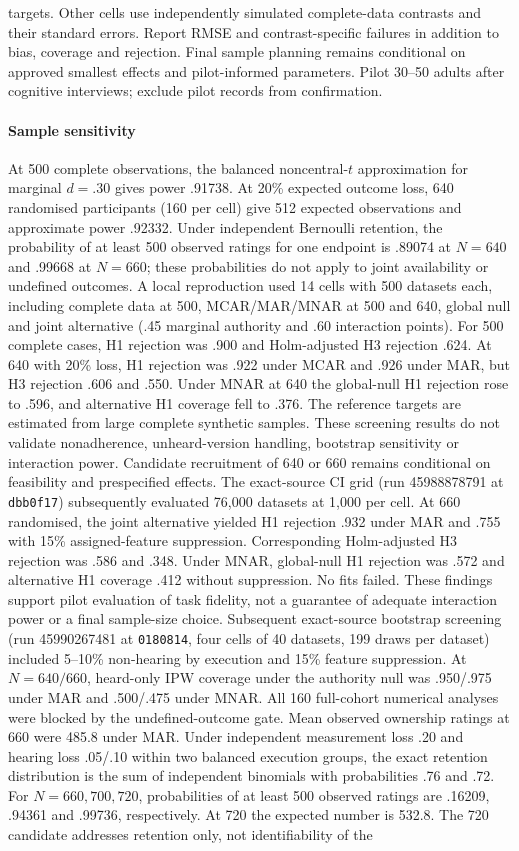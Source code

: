 \documentclass[11pt]{article}
\begin{document}
targets. Other cells use independently simulated complete-data contrasts and their standard errors. Report RMSE and contrast-specific failures in addition to bias, coverage and rejection. Final sample planning remains conditional on approved smallest effects and pilot-informed parameters. Pilot 30--50 adults after cognitive interviews; exclude pilot records from confirmation.


\paragraph{Sample sensitivity}
At 500 complete observations, the balanced noncentral-$t$ approximation for marginal $d=.30$ gives power .91738. At 20\% expected outcome loss, 640 randomised participants (160 per cell) give 512 expected observations and approximate power .92332. Under independent Bernoulli retention, the probability of at least 500 observed ratings for one endpoint is .89074 at $N=640$ and .99668 at $N=660$; these probabilities do not apply to joint availability or undefined outcomes. A local reproduction used 14 cells with 500 datasets each, including complete data at 500, MCAR/MAR/MNAR at 500 and 640, global null and joint alternative (.45 marginal authority and .60 interaction points). For 500 complete cases, H1 rejection was .900 and Holm-adjusted H3 rejection .624. At 640 with 20\% loss, H1 rejection was .922 under MCAR and .926 under MAR, but H3 rejection .606 and .550. Under MNAR at 640 the global-null H1 rejection rose to .596, and alternative H1 coverage fell to .376. The reference targets are estimated from large complete synthetic samples. These screening results do not validate nonadherence, unheard-version handling, bootstrap sensitivity or interaction power. Candidate recruitment of 640 or 660 remains conditional on feasibility and prespecified effects. The exact-source CI grid (run 45988878791 at \texttt{dbb0f17}) subsequently evaluated 76,000 datasets at 1,000 per cell. At 660 randomised, the joint alternative yielded H1 rejection .932 under MAR and .755 with 15\% assigned-feature suppression. Corresponding Holm-adjusted H3 rejection was .586 and .348. Under MNAR, global-null H1 rejection was .572 and alternative H1 coverage .412 without suppression. No fits failed. These findings support pilot evaluation of task fidelity, not a guarantee of adequate interaction power or a final sample-size choice. Subsequent exact-source bootstrap screening (run 45990267481 at \texttt{0180814}, four cells of 40 datasets, 199 draws per dataset) included 5--10\% non-hearing by execution and 15\% feature suppression. At $N=640/660$, heard-only IPW coverage under the authority null was .950/.975 under MAR and .500/.475 under MNAR. All 160 full-cohort numerical analyses were blocked by the undefined-outcome gate. Mean observed ownership ratings at 660 were 485.8 under MAR. Under independent measurement loss .20 and hearing loss .05/.10 within two balanced execution groups, the exact retention distribution is the sum of independent binomials with probabilities .76 and .72. For $N=660,700,720$, probabilities of at least 500 observed ratings are .16209, .94361 and .99736, respectively. At 720 the expected number is 532.8. The 720 candidate addresses retention only, not identifiability of the 
\end{document}
